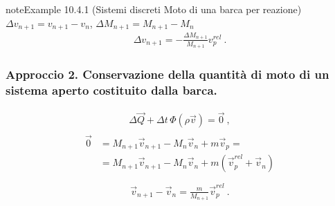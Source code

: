 \documentclass[letterpaper,10pt,italian]{jupyterBook}
\begin{document}
\begin{sphinxadmonition}{note}{Example 10.4.1 (Sistemi discreti \sphinxhyphen{} Moto di una barca per reazione)}
\sphinxAtStartPar
\(\Delta v_{n+1} = v_{n+1} - v_n\), \(\Delta M_{n+1} = M_{n+1} - M_{n}\)
\begin{equation*}
\begin{split}\Delta v_{n+1} = - \frac{\Delta M_{n+1}}{M_{n+1}} v_p^{rel} \ .\end{split}
\end{equation*}\subsubsection*{Approccio 2. Conservazione della quantità di moto di un sistema aperto costituito dalla barca.}
\begin{equation*}
\begin{split}\Delta \vec{Q} + \Delta t \, \Phi(\rho \vec{v}) = \vec{0} \ ,\end{split}
\end{equation*}\begin{equation*}
\begin{split}\begin{aligned}
  \vec{0} & = M_{n+1} \vec{v}_{n+1} - M_{n} \vec{v}_n + m \vec{v}_p =  \\
          & = M_{n+1} \vec{v}_{n+1} - M_{n} \vec{v}_n + m ( \vec{v}_p^{rel} + \vec{v}_n )  \\
\end{aligned}\end{split}
\end{equation*}\begin{equation*}
\begin{split}\vec{v}_{n+1} - \vec{v}_n = \frac{m}{M_{n+1}} \vec{v}_p^{rel} \ .\end{split}
\end{equation*}\end{sphinxadmonition}
\label{ch/mechanics/dynamics-eom-open:example-1}
\end{document}

